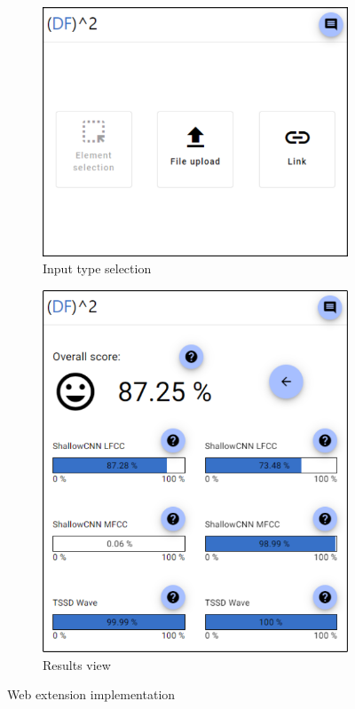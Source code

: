 \begin{figure}[H]
    \begin{subfigure}[h]{0.46\linewidth}
        \centering
        \includegraphics[width=1\linewidth]{other-fig/client_implementation_input_selection.png}
        \caption{Input type selection}
    \end{subfigure}
    \hfill
    \begin{subfigure}[h]{0.46\linewidth}
        \centering
        \includegraphics[width=1\linewidth]{other-fig/client_implementation_results.png}
        \caption{Results view}
    \end{subfigure}
    \caption{Web extension implementation}
    \label{fig:client_implementation}
\end{figure}

